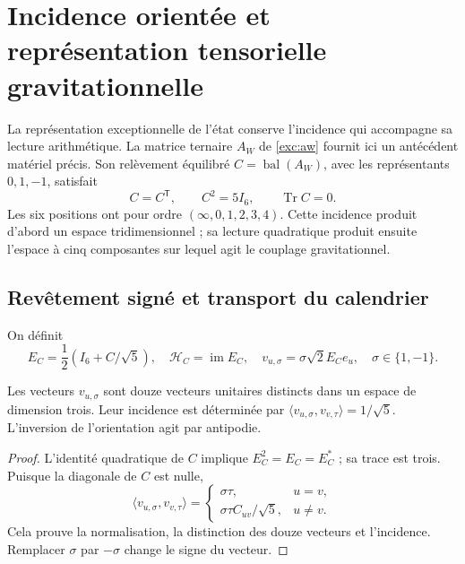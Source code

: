 \section{Incidence orientée et représentation tensorielle gravitationnelle}
\label{vii:sec:pentacomponente}
La représentation exceptionnelle de l'état conserve l'incidence qui accompagne sa lecture arithmétique. La matrice ternaire \(A_W\) de \eqref{exc:aw} fournit ici un antécédent matériel précis. Son relèvement équilibré \(C=\operatorname{bal}(A_W)\), avec les représentants \(0,1,-1\), satisfait
\[
 C=C^{\mathsf T},\qquad C^2=5I_6,\qquad \operatorname{Tr}C=0.
\]
Les six positions ont pour ordre \((\infty,0,1,2,3,4)\). Cette incidence produit d'abord un espace tridimensionnel ; sa lecture quadratique produit ensuite l'espace à cinq composantes sur lequel agit le couplage gravitationnel.

\subsection{Revêtement signé et transport du calendrier}
On définit
\[
 E_C=\frac12(I_6+C/\sqrt5),\quad
 \mathcal H_C=\operatorname{im}E_C,\quad
 v_{u,\sigma}=\sigma\sqrt2E_Ce_u,\quad \sigma\in\{1,-1\}.
\]
\begin{proposition}
\label{vii:prop:doce-orientadas}
Les vecteurs \(v_{u,\sigma}\) sont douze vecteurs unitaires distincts
dans un espace de dimension trois. Leur incidence est déterminée par
\(\langle v_{u,\sigma},v_{v,\tau}\rangle=1/\sqrt5\).
L'inversion de l'orientation agit par antipodie.
\end{proposition}
\begin{proof}
L'identité quadratique de \(C\) implique \(E_C^2=E_C=E_C^*\) ; sa trace est trois. Puisque la diagonale de \(C\) est nulle,
\[
 \langle v_{u,\sigma},v_{v,\tau}\rangle
 =\begin{cases}\sigma\tau,&u=v,\\
 \sigma\tau C_{uv}/\sqrt5,&u\ne v.
 \end{cases}
\]
Cela prouve la normalisation, la distinction des douze vecteurs et l'incidence.
Remplacer \(\sigma\) par \(-\sigma\) change le signe du vecteur.
\end{proof}

